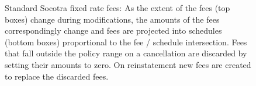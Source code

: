 \begin{figure}[h]
  \caption{
    Standard Socotra fixed rate fees: As the extent of the fees (top boxes) change during modifications, the
    amounts of the fees correspondingly change and fees are projected into schedules (bottom boxes) proportional to
    the fee / schedule intersection. Fees that fall outside the policy range on a
    cancellation are discarded by setting their amounts to zero. On reinstatement new fees are
    created to replace the discarded fees.
  }
  \label{fig:3:1}
\end{figure}

